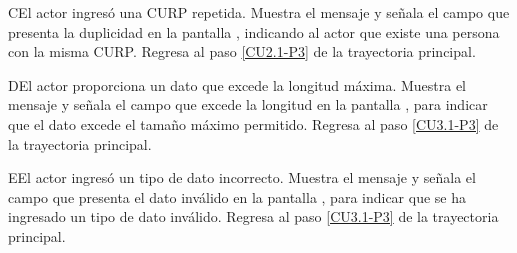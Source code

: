 	\begin{UCtrayectoriaA}{C}{El actor ingresó una CURP repetida.}
		\UCpaso[\UCsist] Muestra el mensaje  y señala el campo que presenta la duplicidad en la pantalla , indicando al actor que existe una persona con la misma CURP.
		\UCpaso Regresa al paso \ref{CU2.1-P3} de la trayectoria principal.
	\end{UCtrayectoriaA}

	\begin{UCtrayectoriaA}{D}{El actor proporciona un dato que excede la longitud máxima.}
		\UCpaso[\UCsist] Muestra el mensaje  y señala el campo que excede la longitud en la pantalla , para indicar que el dato excede el tamaño máximo permitido.
		\UCpaso Regresa al paso \ref{CU3.1-P3} de la trayectoria principal.
	\end{UCtrayectoriaA}

	\begin{UCtrayectoriaA}{E}{El actor ingresó un tipo de dato incorrecto.}
		\UCpaso[\UCsist] Muestra el mensaje  y señala el campo que presenta el dato inválido en la pantalla , para indicar que se ha ingresado un tipo de dato inválido.
		\UCpaso Regresa al paso \ref{CU3.1-P3} de la trayectoria principal.
	\end{UCtrayectoriaA}

